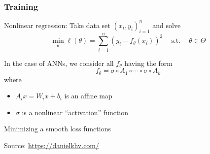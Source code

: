 \documentclass[
    xcolor={svgnames,dvipsnames},
    hyperref={colorlinks, citecolor=DeepPink4, linkcolor=DarkRed, urlcolor=DarkBlue}
    ]{beamer}  %
\newcommand{\st}{\ensuremath{\ \mathrm{s.t.}\ }}
\newcommand{\1}{\mathbbm 1}
\begin{document}
\begin{frame}
    \frametitle{Training}

    Nonlinear regression: Take data set $(x_i, y_i)_{i=1}^n$ and solve
    \begin{equation*}
        \min_\theta  \ell(\theta) = \sum_{i=1}^n (y_i - f_\theta(x_i))^2
        \quad \st \quad \theta \in \Theta
    \end{equation*}

    \vspace{0.5em}
    In the case of ANNs, we consider all $f_\theta$ having the form
    \begin{equation*}
        f_\theta
        = \sigma \circ A_{1} \circ \cdots \circ \sigma \circ A_{k} 
    \end{equation*}
    where
    \begin{itemize}
        \item $A_{i} x = W_{i} x + b_{i} $ is an affine map 
        \vspace{0.5em}
        \item $\sigma$ is a nonlinear ``activation'' function
    \end{itemize}

\end{frame}


\begin{frame}
    

    Minimizing a smooth loss functions
    
    \begin{figure}
       \begin{center}
       \end{center}
    \end{figure}

    Source: \url{https://danielkhv.com/}

\end{frame}
\end{document}
